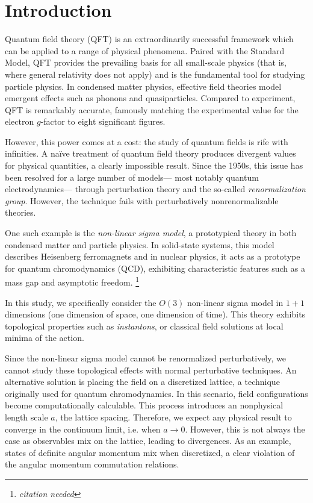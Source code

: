 \documentclass[12pt]{report}
\newcommand{\citeneeded}{\footnote{\textit{citation needed}}}
\begin{document}
\chapter{Introduction}

Quantum field theory (QFT) is an extraordinarily successful framework which can be applied to a range of physical phenomena. Paired with the Standard Model, QFT provides the prevailing basis for all small-scale physics (that is, where general relativity does not apply) and is the fundamental tool for studying particle physics. In condensed matter physics, effective field theories model emergent effects such as phonons and quasiparticles. Compared to experiment, QFT is remarkably accurate, famously matching the experimental value for the electron $g$-factor to eight significant figures.\cite{weisskopf1981} 

However, this power comes at a cost: the study of quantum fields is rife with infinities. A na\"ive treatment of quantum field theory produces divergent values for physical quantities, a clearly impossible result. Since the 1950s, this issue has been resolved for a large number of models--- most notably quantum electrodynamics--- through perturbation theory and the so-called \textit{renormalization group}. However, the technique fails with perturbatively nonrenormalizable theories. 

One such example is the \textit{non-linear sigma model}, a prototypical theory in both condensed matter and particle physics. In solid-state systems, this model describes Heisenberg ferromagnets and in nuclear physics, it acts as a prototype for quantum chromodynamics (QCD), exhibiting characteristic features such as a mass gap and asymptotic freedom. \citeneeded

In this study, we specifically consider the $O(3)$ non-linear sigma model in $1+1$ dimensions (one dimension of space, one dimension of time). This theory exhibits topological properties such as \textit{instantons}, or classical field solutions at local minima of the action.



Since the non-linear sigma model cannot be renormalized perturbatively, we cannot study these topological effects with normal perturbative techniques. An alternative solution is placing the field on a discretized lattice, a technique originally used for quantum chromodynamics. In this scenario, field configurations become computationally calculable. This process introduces an nonphysical length scale $a$, the lattice spacing. Therefore, we expect any physical result to converge in the continuum limit, i.e. when $a\rightarrow 0$. However, this is not always the case as observables mix on the lattice, leading to divergences. As an example, states of definite angular momentum mix when discretized, a clear violation of the angular momentum commutation relations. 
\end{document}
